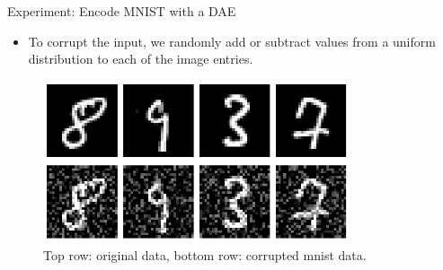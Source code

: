 \documentclass[11pt,compress,t,notes=noshow]{beamer}
\begin{document}
\begin{frame}{Experiment: Encode MNIST with a DAE}
  \begin{itemize}
    \item To corrupt the input, we randomly add or subtract values from a uniform distribution to each of the image entries.
  \end{itemize}
  \begin{figure}
    \centering
    \includegraphics[width=9cm]{plots/mnist_noise.png}
    \caption{Top row: original data, bottom row: corrupted mnist data.}
  \end{figure}
\end{frame}
\end{document}
